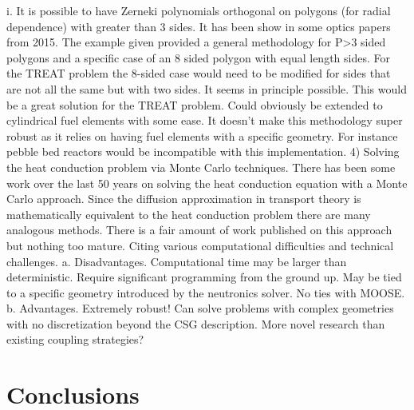 \documentclass[11pt]{article}
\begin{document}
i.	It is possible to have Zerneki polynomials orthogonal on polygons (for radial dependence) with greater than 3 sides.  It has been show in some optics papers from 2015.  The example given provided a general methodology for P>3 sided polygons and a specific case of an 8 sided polygon with equal length sides.  For the TREAT problem the 8-sided case would need to be modified for sides that are not all the same but with two sides.  It seems in principle possible.  This would be a great solution for the TREAT problem. Could obviously be extended to cylindrical fuel elements with some ease.  It doesn’t make this methodology super robust as it relies on having fuel elements with a specific geometry.  For instance pebble bed reactors would be incompatible with this implementation. 	
4)	Solving the heat conduction problem via Monte Carlo techniques.  There has been some work over the last 50 years on solving the heat conduction equation with a Monte Carlo approach.  Since the diffusion approximation in transport theory is mathematically equivalent to the heat conduction problem there are many analogous methods.  There is a fair amount of work published on this approach but nothing too mature.  Citing various computational difficulties and technical challenges. 
a.	Disadvantages.  Computational time may be larger than deterministic.  Require significant programming from the ground up.  May be tied to a specific geometry introduced by the neutronics solver.  No ties with MOOSE.
b.	Advantages.  Extremely robust!  Can solve problems with complex geometries with no discretization beyond the CSG description.  More novel research than existing coupling strategies?

\section{Conclusions}



\end{document}
